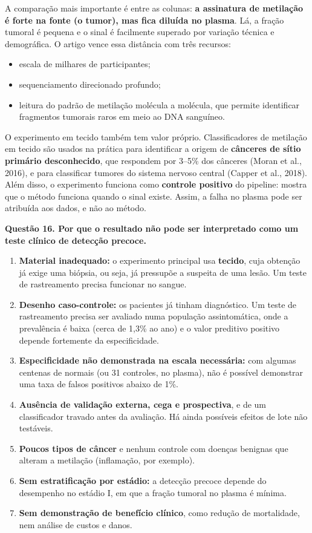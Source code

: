 \documentclass[11pt,a4paper]{article}
\providecommand{\tightlist}{\setlength{\itemsep}{0pt}\setlength{\parskip}{0pt}}
\begin{document}
A comparação mais importante é entre as colunas: \textbf{a assinatura de
metilação é forte na fonte (o tumor), mas fica diluída no plasma}. Lá, a fração
tumoral é pequena e o sinal é facilmente superado por variação técnica e
demográfica. O artigo vence essa distância com três recursos:

\begin{itemize}
\tightlist
\item
  escala de milhares de participantes;
\item
  sequenciamento direcionado profundo;
\item
  leitura do padrão de metilação molécula a molécula, que permite identificar
  fragmentos tumorais raros em meio ao DNA sanguíneo.
\end{itemize}

O experimento em tecido também tem valor próprio. Classificadores de metilação
em tecido são usados na prática para identificar a origem de \textbf{cânceres de
sítio primário desconhecido}, que respondem por 3--5\% dos cânceres (Moran et
al., 2016), e para classificar tumores do sistema nervoso central (Capper et
al., 2018). Além disso, o experimento funciona como \textbf{controle positivo}
do pipeline: mostra que o método funciona quando o sinal existe. Assim, a falha
no plasma pode ser atribuída aos dados, e não ao método.

\textbf{Questão 16. Por que o resultado não pode ser interpretado como um teste
clínico de detecção precoce.}

\begin{enumerate}
\def\labelenumi{\arabic{enumi}.}
\tightlist
\item
  \textbf{Material inadequado:} o experimento principal usa \textbf{tecido},
  cuja obtenção já exige uma biópsia, ou seja, já pressupõe a suspeita de uma
  lesão. Um teste de rastreamento precisa funcionar no sangue.
\item
  \textbf{Desenho caso-controle:} os pacientes já tinham diagnóstico. Um teste
  de rastreamento precisa ser avaliado numa população assintomática, onde a
  prevalência é baixa (cerca de 1,3\% ao ano) e o valor preditivo positivo
  depende fortemente da especificidade.
\item
  \textbf{Especificidade não demonstrada na escala necessária:} com algumas
  centenas de normais (ou 31 controles, no plasma), não é possível demonstrar
  uma taxa de falsos positivos abaixo de 1\%.
\item
  \textbf{Ausência de validação externa, cega e prospectiva}, e de um
  classificador travado antes da avaliação. Há ainda possíveis efeitos de lote
  não testáveis.
\item
  \textbf{Poucos tipos de câncer} e nenhum controle com doenças benignas que
  alteram a metilação (inflamação, por exemplo).
\item
  \textbf{Sem estratificação por estádio:} a detecção precoce depende do
  desempenho no estádio I, em que a fração tumoral no plasma é mínima.
\item
  \textbf{Sem demonstração de benefício clínico}, como redução de mortalidade,
  nem análise de custos e danos.
\end{enumerate}
\end{document}
